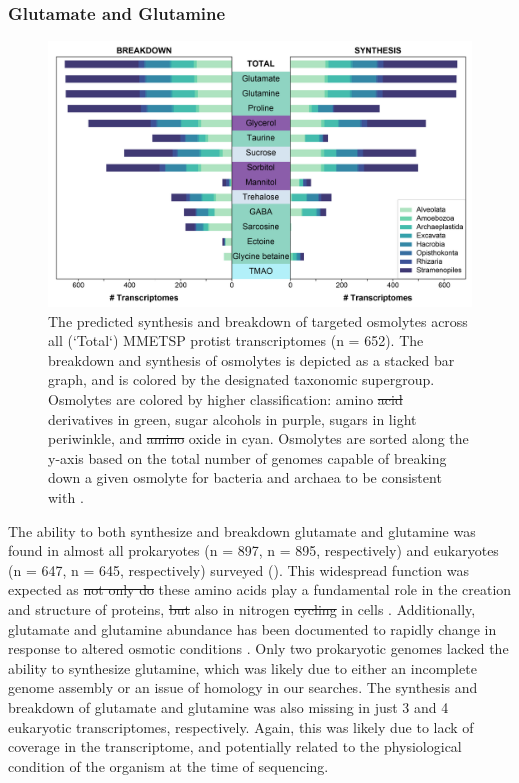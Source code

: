 \documentclass[utf8]{frontiersSCNS} %
\providecommand{\DIFaddtex}[1]{{\protect\color{blue}\uwave{#1}}} %
\providecommand{\DIFdeltex}[1]{{\protect\color{red}\sout{#1}}}                      %
\providecommand{\DIFaddbegin}{} %
\providecommand{\DIFaddend}{} %
\providecommand{\DIFdelbegin}{} %
\providecommand{\DIFdelend}{} %
\providecommand{\DIFaddFL}[1]{\DIFadd{#1}} %
\providecommand{\DIFdelFL}[1]{\DIFdel{#1}} %
\providecommand{\DIFaddbeginFL}{} %
\providecommand{\DIFaddendFL}{} %
\providecommand{\DIFdelbeginFL}{} %
\providecommand{\DIFdelendFL}{} %
\providecommand{\DIFadd}[1]{\texorpdfstring{\DIFaddtex{#1}}{#1}} %
\providecommand{\DIFdel}[1]{\texorpdfstring{\DIFdeltex{#1}}{}} %
\begin{document}
\subsubsection*{Glutamate and Glutamine}
\begin{figure}[t!]
    \centering
    \includegraphics[width = 0.9\columnwidth]{Figures/Eukaryote-Synthesis-Breakdown-v2021-03-14-01.png}
    \caption{The predicted synthesis and breakdown of targeted osmolytes across all (`Total`) MMETSP protist transcriptomes (n = 652). The breakdown and synthesis of osmolytes is depicted as a stacked bar graph, and is colored by the designated taxonomic supergroup. Osmolytes are colored by higher classification: amino \DIFdelbeginFL \DIFdelFL{acid }\DIFdelendFL \DIFaddbeginFL \DIFaddFL{acids and }\DIFaddendFL derivatives in green, sugar alcohols in purple, sugars in light periwinkle, and \DIFdelbeginFL \DIFdelFL{amino }\DIFdelendFL \DIFaddbeginFL \DIFaddFL{an amine }\DIFaddendFL oxide in cyan. Osmolytes are sorted along the y-axis based on the total number of genomes capable of breaking down a given osmolyte for bacteria and archaea to be consistent with .}
    \label{fig:euk}
\end{figure}
The ability to both synthesize and breakdown glutamate and glutamine was found in almost all prokaryotes (n = 897, n = 895, respectively) and eukaryotes (n = 647, n = 645, respectively) surveyed (). This widespread function was expected as \DIFdelbegin \DIFdel{not only do }\DIFdelend these amino acids play \DIFaddbegin \DIFadd{both }\DIFaddend a fundamental role in the creation and structure of proteins, \DIFdelbegin \DIFdel{but }\DIFdelend \DIFaddbegin \DIFadd{and }\DIFaddend also in nitrogen \DIFdelbegin \DIFdel{cycling }\DIFdelend \DIFaddbegin \DIFadd{recycling }\DIFaddend in cells \citep{Reitzer2003}. Additionally, glutamate and glutamine abundance has been documented to rapidly change in response to altered osmotic conditions \citep{Saum2008}. Only two prokaryotic genomes lacked the ability to synthesize glutamine, which was likely due to either an incomplete genome assembly or an issue of homology in our searches. The synthesis and breakdown of glutamate and glutamine was also missing in just 3 and 4 eukaryotic transcriptomes, respectively. Again, this was likely due to lack of coverage in the transcriptome, and potentially related to the physiological condition of the organism at the time of sequencing.
\end{document}
